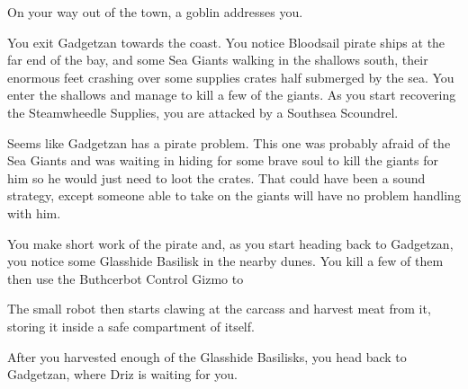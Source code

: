 


On your way out of the town, a goblin addresses you.


You exit Gadgetzan towards the coast. You notice Bloodsail pirate ships at the far end of the bay, and some Sea Giants walking in the shallows south, their enormous feet crashing over some supplies crates half submerged by the sea. You enter the shallows and manage to kill a few of the giants. As you start recovering the Steamwheedle Supplies, you are attacked by a Southsea Scoundrel.


Seems like Gadgetzan has a pirate problem. This one was probably afraid of the Sea Giants and was waiting in hiding for some brave soul to kill the giants for him so he would just need to loot the crates. That could have been a sound strategy, except someone able to take on the giants will have no problem handling with him.

You make short work of the pirate and, as you start heading back to Gadgetzan, you notice some Glasshide Basilisk in the nearby dunes. You kill a few of them then use the Buthcerbot Control Gizmo to 


The small robot then starts clawing at the carcass and harvest meat from it, storing it inside a safe compartment of itself.

After you harvested enough of the Glasshide Basilisks, you head back to Gadgetzan, where Driz is waiting for you.



